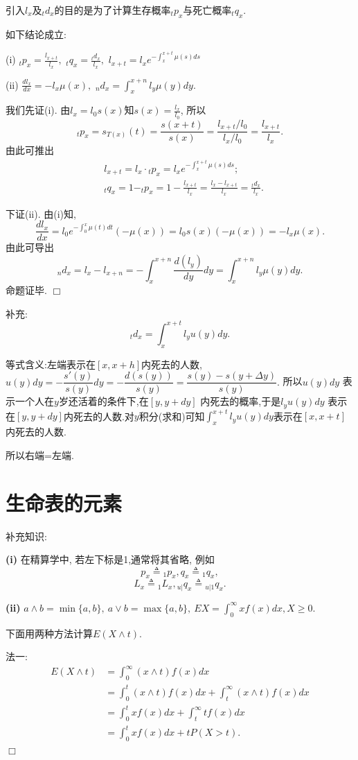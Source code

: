 \documentclass[a4paper,10pt]{ctexbook}
\def\qed{\hfill$\Box$\medskip}
\begin{document}
引入$l_x$及${}_td_x$的目的是为了计算生存概率${}_tp_x$与死亡概率${}_tq_x.$
\begin{proposition}如下结论成立:

    (i) ${}_tp_x=\frac{l_{x+t}}{l_x},$  ${}_tq_x=\frac{{}_td_x}{l_x},$  $l_{x+t}=l_xe^{-\int_{x}^{x+t}\mu(s)ds}$

    (ii) $\frac{dl_x}{dx}=-l_x\mu(x),$ $_nd_x=\int_{x}^{x+n}l_y\mu(y)dy.$
\end{proposition}

\proof 我们先证(i). 由$l_x=l_0s(x)$知$s(x)=\frac{l_x}{l_0}$, 所以
$$_tp_x=s_{T(x)}(t)=\frac{s(x+t)}{s(x)}=\frac{l_{x+t}/l_0}{l_x/l_0}=\frac{l_{x+t}}{l_x}.$$
由此可推出\begin{align*}
     & l_{x+t}=l_x\cdot{}_tp_x=l_xe^{-\int_{x}^{x+t}\mu(s)ds};                          \\
     & {}_tq_x=1-_tp_x=1-\frac{l_{x+t}}{l_x}=\frac{l_x-l_{x+t}}{l_x}=\frac{_td_x}{l_x}.
\end{align*}

下证(ii). 由(i)知,
$$\frac{dl_x}{dx}=l_0e^{-\int_{0}^{x}\mu(t)dt}(-\mu(x))=l_0s(x)(-\mu(x))=-l_x\mu(x).$$
由此可导出
$${}_nd_x=l_x-l_{x+n}=-\int_{x}^{x+n}\frac{d(l_y)}{dy}dy=\int_{x}^{x+n}l_y\mu(y)dy.$$
命题证毕.
\qed

补充:
$${}_td_x=\int_x^{x+t} l_yu(y)dy.$$

等式含义:左端表示在$[x,x+h]$内死去的人数, $u(y)dy=-\dfrac{s'(y)}{s(y)}dy=-\dfrac{d(s(y))}{s(y)}=\dfrac{s(y)-s(y+\Delta y)}{s(y)}.$ 所以$u(y)dy$ 表示一个人在$y$岁还活着的条件下,在$[y,y+dy]$ 内死去的概率,于是$l_yu(y)dy$ 表示在$[y,y+dy]$内死去的人数.对$y$积分(求和)可知$\int_x^{x+t}l_yu(y)dy$表示在$[x,x+t]$内死去的人数.

所以右端=左端.
\section{生命表的元素}
补充知识:

{\rm\bf(i)} 在精算学中, 若左下标是1,通常将其省略, 例如
$${p_x}\triangleq{}_1p_x,{q_x}\triangleq{}_1q_x,$$
$$L_x\triangleq{}_1L_x,{}_{u|}q_x\triangleq{}_{u|1}q_x.$$

{\rm\bf(ii)} $a\wedge b=\min\{a,b\},\ a\vee b=\max\{a,b\},\ EX=\int_0^{\infty}xf(x)dx,X\ge0.$

下面用两种方法计算$E(X\wedge t).$


法一:
\begin{align*}
    E(X\wedge t) & =\int_0^{\infty}(x\wedge t)f(x)dx                           \\
                 & =\int_0^t(x\wedge t)f(x)dx+\int_t^{\infty}(x\wedge t)f(x)dx \\
                 & =\int_0^txf(x)dx+\int_t^{\infty}tf(x)dx                     \\
                 & =\int_0^txf(x)dx+tP(X>t).
\end{align*}
\qed
\end{document}
